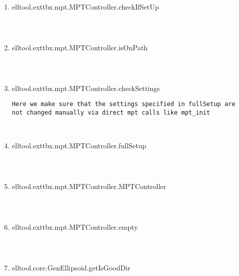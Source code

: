 \begin{enumerate}
\begin{lstlisting}
\end{lstlisting}
\fontfamily{\familydefault}
\selectfont
\item {elltool.exttbx.mpt.MPTController.checkIfSetUp}
\selectfont
\begin{lstlisting}



\end{lstlisting}
\fontfamily{\familydefault}
\selectfont
\item {elltool.exttbx.mpt.MPTController.isOnPath}
\selectfont
\begin{lstlisting}



\end{lstlisting}
\fontfamily{\familydefault}
\selectfont
\item {elltool.exttbx.mpt.MPTController.checkSettings}
\selectfont
\begin{lstlisting}
Here we make sure that the settings specified in fullSetup are
not changed manually via direct mpt calls like mpt_init



\end{lstlisting}
\fontfamily{\familydefault}
\selectfont
\item {elltool.exttbx.mpt.MPTController.fullSetup}
\selectfont
\begin{lstlisting}



\end{lstlisting}
\fontfamily{\familydefault}
\selectfont
\item {elltool.exttbx.mpt.MPTController.MPTController}
\selectfont
\begin{lstlisting}



\end{lstlisting}
\fontfamily{\familydefault}
\selectfont
\item {elltool.exttbx.mpt.MPTController.empty}
\selectfont
\begin{lstlisting}



\end{lstlisting}
\fontfamily{\familydefault}
\selectfont
\item {elltool.core.GenEllipsoid.getIsGoodDir}
\selectfont
\begin{lstlisting}




\end{lstlisting}
\end{enumerate}
